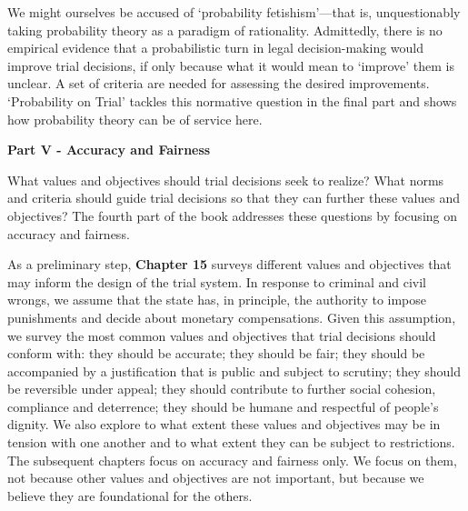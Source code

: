 \documentclass[
  10pt,
  dvipsnames,enabledeprecatedfontcommands]{scrartcl}
\begin{document}
We might ourselves be accused of `probability fetishism'---that is,
unquestionably taking probability theory as a paradigm of rationality.
Admittedly, there is no empirical evidence that a probabilistic turn in
legal decision-making would improve trial decisions, if only because
what it would mean to `improve' them is unclear. A set of criteria are
needed for assessing the desired improvements. `Probability on Trial'
tackles this normative question in the final part and shows how
probability theory can be of service here.

\vspace{3mm}

\noindent \textbf{Part V - Accuracy and Fairness}

\noindent What values and objectives should trial decisions seek to
realize? What norms and criteria should guide trial decisions so that
they can further these values and objectives? The fourth part of the
book addresses these questions by focusing on accuracy and fairness.

As a preliminary step, \textbf{Chapter 15} surveys different values and
objectives that may inform the design of the trial system. In response
to criminal and civil wrongs, we assume that the state has, in
principle, the authority to impose punishments and decide about monetary
compensations. Given this assumption, we survey the most common values
and objectives that trial decisions should conform with: they should be
accurate; they should be fair; they should be accompanied by a
justification that is public and subject to scrutiny; they should be
reversible under appeal; they should contribute to further social
cohesion, compliance and deterrence; they should be humane and
respectful of people's dignity. We also explore to what extent these
values and objectives may be in tension with one another and to what
extent they can be subject to restrictions. The subsequent chapters
focus on accuracy and fairness only. We focus on them, not because other
values and objectives are not important, but because we believe they are
foundational for the others.
\end{document}
